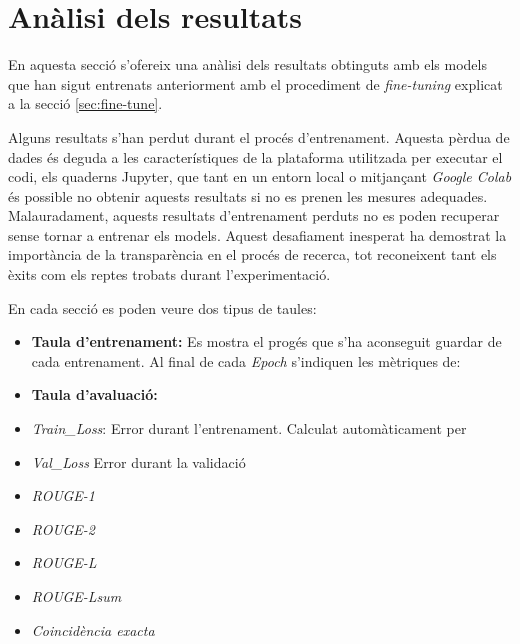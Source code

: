 \section{Anàlisi dels resultats}
En aquesta secció s'ofereix una anàlisi dels resultats obtinguts amb els models que han sigut entrenats anteriorment amb el procediment de \textit{fine-tuning} explicat a la secció \ref{sec:fine-tune}.

Alguns resultats s'han perdut durant el procés d'entrenament. Aquesta pèrdua de dades és deguda a les característiques de la plataforma utilitzada per executar el codi, els quaderns Jupyter, que tant en un entorn local o mitjançant \textit{Google Colab} és possible no obtenir aquests resultats si no es prenen les mesures adequades. Malauradament, aquests resultats d'entrenament perduts no es poden recuperar sense tornar a entrenar els models. Aquest desafiament inesperat ha demostrat la importància de la transparència en el procés de recerca, tot reconeixent tant els èxits com els reptes trobats durant l'experimentació.

En cada secció es poden veure dos tipus de taules:
\begin{itemize}
    \item \textbf{Taula d'entrenament:} Es mostra el progés que s'ha aconseguit guardar de cada entrenament. Al final de cada \textit{Epoch} s'indiquen les mètriques de:

    \item \textbf{Taula d'avaluació:} 
\end{itemize}

\begin{itemize}
    \item \textit{Train\_Loss}: Error durant l'entrenament. Calculat automàticament per 
    \item \textit{Val\_Loss} Error durant la validació
    \item \textit{ROUGE-1}
    \item \textit{ROUGE-2}
    \item \textit{ROUGE-L}
    \item \textit{ROUGE-Lsum}
    \item \textit{Coincidència exacta}
\end{itemize}

